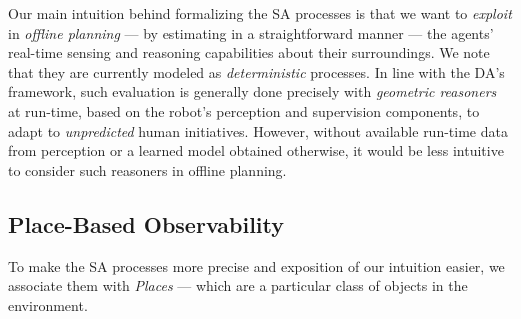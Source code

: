 \documentclass[letterpaper]{article} %
\begin{document}

Our main intuition behind formalizing the SA processes is that we want to \textit{exploit} in \textit{offline planning} --- by estimating in a straightforward manner --- the agents' real-time sensing and reasoning capabilities about their surroundings. 
We note that they are currently modeled as \textit{deterministic} processes. 
In line with the DA's framework, such evaluation is generally done precisely with \textit{geometric reasoners} at run-time, based on the robot's perception and supervision components, to adapt to \textit{unpredicted} human initiatives. 
However, without available run-time data from perception or a learned model obtained otherwise, it would be less intuitive to consider such reasoners in offline planning.

\subsection{Place-Based Observability}




To make the SA processes more precise and exposition of our intuition easier, we associate them with  \textit{Places} --- which are a particular class of objects in the environment. 
\end{document}
